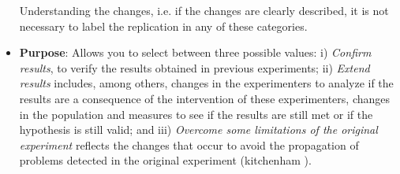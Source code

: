 \begin{itemize}
Understanding the changes, i.e. if the changes are clearly described, it is not necessary to label the replication in any of these categories. 

\item \textbf {Purpose}: Allows you to select between three possible values: i) \textit{Confirm results}, to verify the results obtained in previous experiments; ii) \textit{Extend results} includes, among others, changes in the experimenters to analyze if the results are a consequence of the intervention of these experimenters, changes in the population and measures to see if the results are still met or if the hypothesis is still valid; and iii) \textit{Overcome some limitations of the original experiment} reflects the changes that occur to avoid the propagation of problems detected in the original experiment (kitchenham \cite{kitchenham2008role}).  %
 \end{itemize}
 
